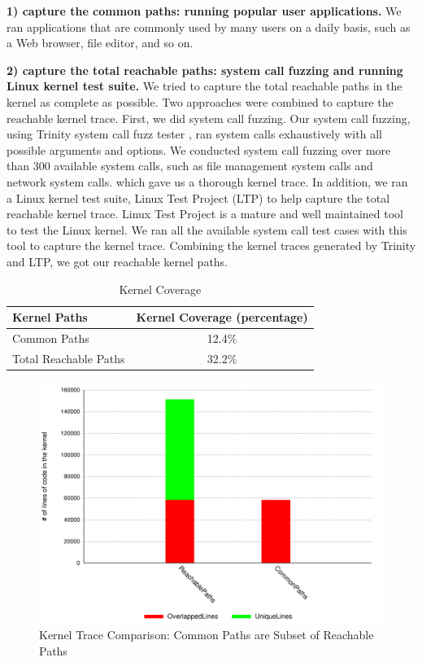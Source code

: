 \textbf{1) capture the common paths: running popular user applications.} 
We ran applications that are commonly used by many users on a daily basis, such as a Web browser, 
file editor, and so on.  

\textbf{2) capture the total reachable paths: system call fuzzing and running Linux kernel test suite.}
We tried to capture the total reachable paths in the kernel as complete as possible. 
Two approaches were combined to capture the reachable kernel trace. 
First, we did system call fuzzing. 
Our system call fuzzing, using Trinity system call fuzz tester \cite{Trinity}, ran system calls exhaustively with all possible 
arguments and options. We conducted system call fuzzing over more than 300 available system calls, such as 
file management system calls and network system calls. 
 which gave us a thorough kernel trace. 
In addition, we ran a Linux kernel test suite, 
Linux Test Project (LTP) \cite{LTP} 
to help capture the total reachable kernel trace. 
Linux Test Project is a mature and well maintained tool to test the Linux kernel. We ran all the available system call 
test cases with this tool to capture the kernel trace. 
Combining the kernel traces generated by Trinity and LTP, we got our reachable kernel paths.


\begin{table}%
\centering
\scriptsize
\begin{tabular}{|l|c|}
  \hline
  \textbf{Kernel Paths} & \textbf{Kernel Coverage (percentage)} \\
  \hline \hline
  Common Paths & 12.4\% \\
  \hline
  Total Reachable Paths & 32.2\% \\
  \hline
\end{tabular}
\caption {Kernel Coverage}
\label{table:kernel_coverage}
\end{table}

\begin{figure}%
\centering
\includegraphics[width=1.0\columnwidth]{diagram/lind_ccs15_diagram_01.pdf}
\caption{Kernel Trace Comparison: Common Paths are Subset of Reachable Paths }
\label{fig:subset}
\end{figure}

